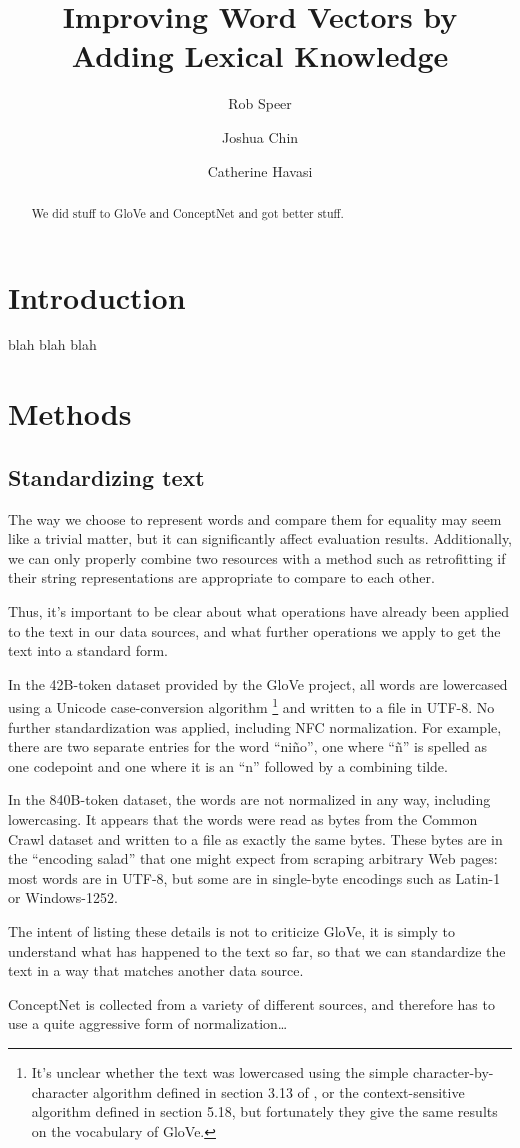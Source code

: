 \documentclass{article}
\title{Improving Word Vectors by Adding Lexical Knowledge}
\author{Rob Speer \and Joshua Chin \and Catherine Havasi}
\begin{document}
\maketitle
\begin{abstract}
We did stuff to GloVe and ConceptNet and got better stuff.
\end{abstract}

\section{Introduction}
blah blah blah

\section{Methods}

\subsection{Standardizing text}

The way we choose to represent words and compare them for equality may seem
like a trivial matter, but it can significantly affect evaluation results.
Additionally, we can only properly combine two resources with a method such
as retrofitting if their string representations are appropriate to compare
to each other.

Thus, it's important to be clear about what operations have already been
applied to the text in our data sources, and what further operations we
apply to get the text into a standard form.

In the 42B-token dataset provided by the GloVe project, all words are lowercased
using a Unicode case-conversion algorithm
\footnote{
    It's unclear whether the text was lowercased using the simple
    character-by-character algorithm defined in section 3.13 of
    \cite{unicode2014}, or the context-sensitive algorithm defined in section
    5.18, but fortunately they give the same results on the vocabulary of
    GloVe.
} and written to a file in UTF-8. No further standardization was applied,
including NFC normalization. For example, there are two separate entries for
the word ``ni\~{n}o'', one where ``\~{n}'' is spelled as one codepoint and one
where it is an ``n'' followed by a combining tilde.

In the 840B-token dataset, the words are not normalized in any way, including
lowercasing. It appears that the words were read as bytes from the Common Crawl
dataset and written to a file as exactly the same bytes. These bytes are in the
``encoding salad'' that one might expect from scraping arbitrary Web pages:
most words are in UTF-8, but some are in single-byte encodings such as Latin-1
or Windows-1252.

The intent of listing these details is not to criticize GloVe, it is simply to
understand what has happened to the text so far, so that we can standardize the
text in a way that matches another data source.

ConceptNet is collected from a variety of different sources, and therefore has to
use a quite aggressive form of normalization\ldots
\end{document}

